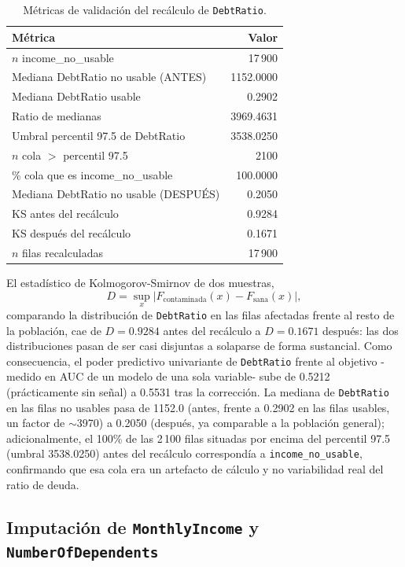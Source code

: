 \documentclass[11pt,a4paper]{article}
\begin{document}
\begin{table}[H]
\centering
\caption{M\'etricas de validaci\'on del rec\'alculo de \texttt{DebtRatio}.}
\label{tab:debtratio_recalculo}
\begin{tabular}{lr}
\toprule
M\'etrica & Valor \\
\midrule
$n$ income\_no\_usable & 17\,900 \\
Mediana DebtRatio no usable (ANTES) & 1152.0000 \\
Mediana DebtRatio usable & 0.2902 \\
Ratio de medianas & 3969.4631 \\
Umbral percentil 97.5 de DebtRatio & 3538.0250 \\
$n$ cola $>$ percentil 97.5 & 2100 \\
\% cola que es income\_no\_usable & 100.0000 \\
Mediana DebtRatio no usable (DESPU\'ES) & 0.2050 \\
KS antes del rec\'alculo & 0.9284 \\
KS despu\'es del rec\'alculo & 0.1671 \\
$n$ filas recalculadas & 17\,900 \\
\bottomrule
\end{tabular}
\end{table}

El estad\'istico de Kolmogorov-Smirnov de dos muestras,
\[
D = \sup_x \left| F_{\text{contaminada}}(x) - F_{\text{sana}}(x) \right|,
\]
comparando la distribuci\'on de \texttt{DebtRatio} en las filas afectadas frente al resto de la poblaci\'on, cae de $D=0.9284$ antes del rec\'alculo a $D=0.1671$ despu\'es: las dos distribuciones pasan de ser casi disjuntas a solaparse de forma sustancial. Como consecuencia, el poder predictivo univariante de \texttt{DebtRatio} frente al objetivo -medido en AUC de un modelo de una sola variable- sube de 0.5212 (pr\'acticamente sin se\~nal) a 0.5531 tras la correcci\'on. La mediana de \texttt{DebtRatio} en las filas no usables pasa de 1152.0 (antes, frente a 0.2902 en las filas usables, un factor de $\sim$3970) a 0.2050 (despu\'es, ya comparable a la poblaci\'on general); adicionalmente, el 100\% de las 2\,100 filas situadas por encima del percentil 97.5 (umbral 3538.0250) antes del rec\'alculo correspond\'ia a \texttt{income\_no\_usable}, confirmando que esa cola era un artefacto de c\'alculo y no variabilidad real del ratio de deuda.

\subsection{Imputaci\'on de \texttt{MonthlyIncome} y \texttt{NumberOfDependents}}
\label{sec:imputacion_income}
\end{document}

